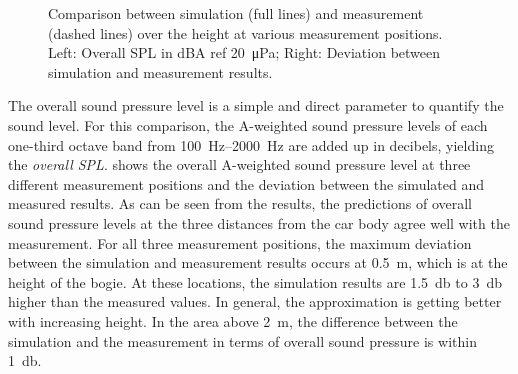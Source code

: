 \begin{figure}
\begin{subfigure}[b]{0.49\textwidth}
	\end{subfigure}
	\caption{Comparison between simulation (full lines) and measurement (dashed lines) over the height at various measurement positions. Left: Overall SPL in dBA ref \SI{20}{\micro\pascal}; Right: Deviation between simulation and measurement results.}
	\label{fig:overall_SPL}
\end{figure}
The overall sound pressure level is a simple and direct parameter to quantify the sound level. 
For this comparison, the A-weighted sound pressure levels of each one-third octave band from \SIrange{100}{2000}{\hertz} are added up in decibels, yielding the \emph{overall SPL}. 
 shows the overall A-weighted sound pressure level at three different measurement positions and the deviation between the simulated and measured results. As can be seen from the results, the predictions of overall sound pressure levels at the three distances from the car body agree well with the measurement. For all three measurement positions, the maximum deviation between the simulation and measurement results occurs at \SI{0.5}{\meter}, which is at the height of the bogie. At these locations, the simulation results are \SI{1.5}{\decibel} to \SI{3}{\decibel} higher than the measured values. In general, the approximation is getting better with increasing height. In the area above \SI{2}{\meter}, the difference between the simulation and the measurement in terms of overall sound pressure is within \SI{1}{\decibel}.

